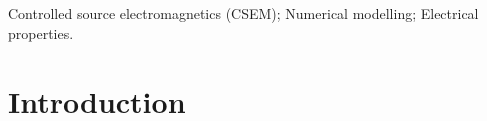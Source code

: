 \documentclass[extra, camera,%
]{gji}
\begin{document}
\begin{keywords}
  Controlled source electromagnetics (CSEM); Numerical modelling; Electrical properties.
\end{keywords}




\section{Introduction}
\end{document}
